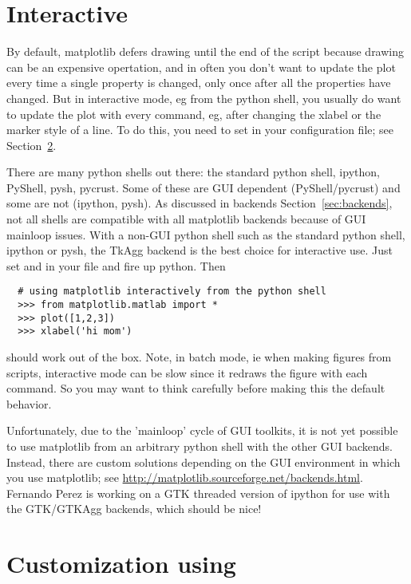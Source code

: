 \documentclass[twoside]{book}
\begin{document}
\section{Interactive}
\label{sec:interactive}

By default, matplotlib defers drawing until the end of the script
because drawing can be an expensive opertation, and in often you don't
want to update the plot every time a single property is changed, only
once after all the properties have changed.  But in interactive mode,
eg from the python shell, you usually do want to update the plot with
every command, eg, after changing the xlabel or the marker style of a
line.  To do this, you need to set  in your
configuration file; see Section~\ref{sec:matplotlibrc}.

There are many python shells out there: the standard python shell,
ipython, PyShell, pysh, pycrust.  Some of these are GUI dependent
(PyShell/pycrust) and some are not (ipython, pysh).  As discussed in
backends Section~\ref{sec:backends}, not all shells are compatible
with all matplotlib backends because of GUI mainloop issues.  With a
non-GUI python shell such as the standard python shell, ipython or
pysh, the TkAgg backend is the best choice for interactive use.  Just
set  and  in your
file and fire up python.  Then

\begin{lstlisting}
  # using matplotlib interactively from the python shell
  >>> from matplotlib.matlab import *
  >>> plot([1,2,3])
  >>> xlabel('hi mom')
\end{lstlisting}

\noindent should work out of the box.  Note, in batch mode, ie when making
figures from scripts, interactive mode can be slow since it redraws
the figure with each command.  So you may want to think carefully
before making this the default behavior.

Unfortunately, due to the 'mainloop' cycle of GUI toolkits, it is not
yet possible to use matplotlib from an arbitrary python shell with the
other GUI backends.  Instead, there are custom solutions depending on
the GUI environment in which you use matplotlib; see
\url{http://matplotlib.sourceforge.net/backends.html}.  Fernando Perez
is working on a GTK threaded version of ipython for use with the
GTK/GTKAgg backends, which should be nice!


\section{Customization using }
\label{sec:matplotlibrc}
\end{document}
